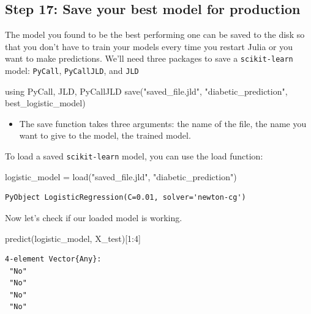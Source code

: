 \documentclass[
  letterpaper,
]{book}
\newenvironment{Shaded}{\begin{snugshade}}{\end{snugshade}}
\newcommand{\BuiltInTok}[1]{\textcolor[rgb]{0.00,0.23,0.31}{#1}}
\newcommand{\FloatTok}[1]{\textcolor[rgb]{0.68,0.00,0.00}{#1}}
\newcommand{\FunctionTok}[1]{\textcolor[rgb]{0.28,0.35,0.67}{#1}}
\newcommand{\ImportTok}[1]{\textcolor[rgb]{0.00,0.46,0.62}{#1}}
\newcommand{\NormalTok}[1]{\textcolor[rgb]{0.00,0.23,0.31}{#1}}
\newcommand{\OperatorTok}[1]{\textcolor[rgb]{0.37,0.37,0.37}{#1}}
\newcommand{\StringTok}[1]{\textcolor[rgb]{0.13,0.47,0.30}{#1}}
\providecommand{\tightlist}{%
  \setlength{\itemsep}{0pt}\setlength{\parskip}{0pt}}\usepackage{longtable,booktabs,array}
\begin{document}
\hypertarget{step-17-save-your-best-model-for-production}{%
\subsection*{Step 17: Save your best model for
production}\label{step-17-save-your-best-model-for-production}}

The model you found to be the best performing one can be saved to the
disk so that you don't have to train your models every time you restart
Julia or you want to make predictions. We'll need three packages to save
a \texttt{scikit-learn} model: \texttt{PyCall}, \texttt{PyCallJLD}, and
\texttt{JLD}

\begin{Shaded}
\begin{Highlighting}[]
\ImportTok{using} \BuiltInTok{PyCall}\NormalTok{, }\BuiltInTok{JLD}\NormalTok{, }\BuiltInTok{PyCallJLD}
\FunctionTok{save}\NormalTok{(}\StringTok{"saved\_file.jld"}\NormalTok{, }\StringTok{"diabetic\_prediction"}\NormalTok{, best\_logistic\_model)}
\end{Highlighting}
\end{Shaded}

\begin{itemize}
\tightlist
\item
  The save function takes three arguments: the name of the file, the
  name you want to give to the model, the trained model.
\end{itemize}

To load a saved \texttt{scikit-learn} model, you can use the load
function:

\begin{Shaded}
\begin{Highlighting}[]
\NormalTok{logistic\_model }\OperatorTok{=} \FunctionTok{load}\NormalTok{(}\StringTok{"saved\_file.jld"}\NormalTok{, }\StringTok{"diabetic\_prediction"}\NormalTok{)}
\end{Highlighting}
\end{Shaded}

\begin{verbatim}
PyObject LogisticRegression(C=0.01, solver='newton-cg')
\end{verbatim}

Now let's check if our loaded model is working.

\begin{Shaded}
\begin{Highlighting}[]
\FunctionTok{predict}\NormalTok{(logistic\_model, X\_test)[}\FloatTok{1}\OperatorTok{:}\FloatTok{4}\NormalTok{]}
\end{Highlighting}
\end{Shaded}

\begin{verbatim}
4-element Vector{Any}:
 "No"
 "No"
 "No"
 "No"
\end{verbatim}


\backmatter
\end{document}
